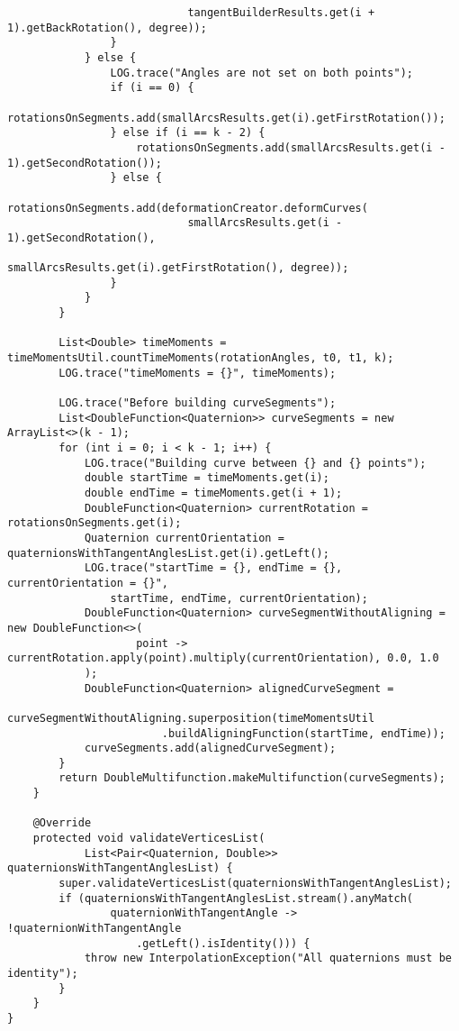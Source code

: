 \begin{verbatim}
                            tangentBuilderResults.get(i + 1).getBackRotation(), degree));
                }
            } else {
                LOG.trace("Angles are not set on both points");
                if (i == 0) {
                    rotationsOnSegments.add(smallArcsResults.get(i).getFirstRotation());
                } else if (i == k - 2) {
                    rotationsOnSegments.add(smallArcsResults.get(i - 1).getSecondRotation());
                } else {
                    rotationsOnSegments.add(deformationCreator.deformCurves(
                            smallArcsResults.get(i - 1).getSecondRotation(),
                            smallArcsResults.get(i).getFirstRotation(), degree));
                }
            }
        }

        List<Double> timeMoments = timeMomentsUtil.countTimeMoments(rotationAngles, t0, t1, k);
        LOG.trace("timeMoments = {}", timeMoments);

        LOG.trace("Before building curveSegments");
        List<DoubleFunction<Quaternion>> curveSegments = new ArrayList<>(k - 1);
        for (int i = 0; i < k - 1; i++) {
            LOG.trace("Building curve between {} and {} points");
            double startTime = timeMoments.get(i);
            double endTime = timeMoments.get(i + 1);
            DoubleFunction<Quaternion> currentRotation = rotationsOnSegments.get(i);
            Quaternion currentOrientation = quaternionsWithTangentAnglesList.get(i).getLeft();
            LOG.trace("startTime = {}, endTime = {}, currentOrientation = {}",
                startTime, endTime, currentOrientation);
            DoubleFunction<Quaternion> curveSegmentWithoutAligning = new DoubleFunction<>(
                    point -> currentRotation.apply(point).multiply(currentOrientation), 0.0, 1.0
            );
            DoubleFunction<Quaternion> alignedCurveSegment =
                    curveSegmentWithoutAligning.superposition(timeMomentsUtil
                        .buildAligningFunction(startTime, endTime));
            curveSegments.add(alignedCurveSegment);
        }
        return DoubleMultifunction.makeMultifunction(curveSegments);
    }

    @Override
    protected void validateVerticesList(
            List<Pair<Quaternion, Double>> quaternionsWithTangentAnglesList) {
        super.validateVerticesList(quaternionsWithTangentAnglesList);
        if (quaternionsWithTangentAnglesList.stream().anyMatch(
                quaternionWithTangentAngle -> !quaternionWithTangentAngle
                    .getLeft().isIdentity())) {
            throw new InterpolationException("All quaternions must be identity");
        }
    }
}
\end{verbatim}

